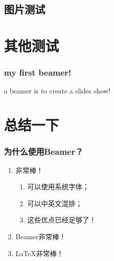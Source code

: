 \documentclass[presentation]{beamer}
\begin{document}
 
\subsection{图片测试} 
 
 
 
\section{其他测试} 
 
 
\begin{frame} 
\frametitle{my first beamer!} 
\begin{definition} 
a \alert{beamer} is to create a slides show! 
\end{definition} 
\end{frame} 
 
 
\section{总结一下} 
 
 
\begin{frame} 
    \frametitle{为什么使用Beamer？} 
    \begin{enumerate} 
      \item \XeLaTeX 非常棒！ 
      \begin{enumerate} 
        \item 可以使用系统字体； 
        \item 可以中英文混排； 
        \item 这些优点已经足够了！ 
      \end{enumerate} 
      \item Beamer非常棒！ 
      \item \LaTeX 非常棒！ 
    \end{enumerate} 
\end{frame} 
 
 
 
 
\end{document}
